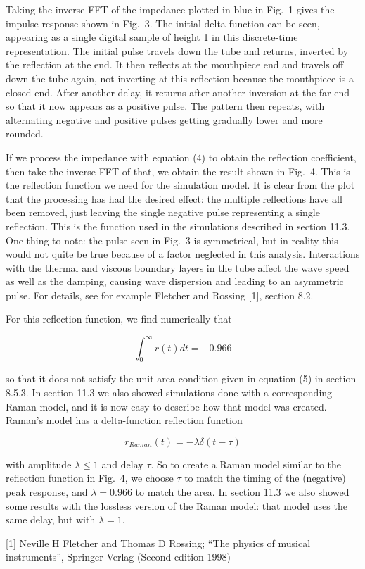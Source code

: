   Taking the inverse FFT of the impedance plotted in blue in Fig.\ 1 gives the 
  impulse response shown in Fig.\ 3. The initial delta function can be seen, 
  appearing as a single digital sample of height 1 in this discrete-time 
  representation. The initial pulse travels down the tube and returns, inverted 
  by the reflection at the end. It then reflects at the mouthpiece end and 
  travels off down the tube again, not inverting at this reflection because the 
  mouthpiece is a closed end. After another delay, it returns after another 
  inversion at the far end so that it now appears as a positive pulse. The 
  pattern then repeats, with alternating negative and positive pulses getting 
  gradually lower and more rounded. 


  If we process the impedance with equation (4) to obtain the reflection 
  coefficient, then take the inverse FFT of that, we obtain the result shown in 
  Fig.\ 4. This is the reflection function we need for the simulation model. It 
  is clear from the plot that the processing has had the desired effect: the 
  multiple reflections have all been removed, just leaving the single negative 
  pulse representing a single reflection. This is the function used in the 
  simulations described in section 11.3. One thing to note: the pulse seen in 
  Fig.\ 3 is symmetrical, but in reality this would not quite be true because 
  of a factor neglected in this analysis. Interactions with the thermal and 
  viscous boundary layers in the tube affect the wave speed as well as the 
  damping, causing wave dispersion and leading to an asymmetric pulse. For 
  details, see for example Fletcher and Rossing [1], section 8.2. 


  For this reflection function, we find numerically that 

  $$\int_0^\infty{r(t) dt}=-0.966$$ 

  so that it does not satisfy the unit-area condition given in equation (5) in 
  section 8.5.3. In section 11.3 we also showed simulations done with a 
  corresponding Raman model, and it is now easy to describe how that model was 
  created. Raman's model has a delta-function reflection function 

  $$r_{Raman}(t)=-\lambda \delta(t-\tau)$$ 

  with amplitude $\lambda \le 1$ and delay $\tau$. So to create a Raman model 
  similar to the reflection function in Fig.\ 4, we choose $\tau$ to match the 
  timing of the (negative) peak response, and $\lambda=0.966$ to match the 
  area. In section 11.3 we also showed some results with the lossless version 
  of the Raman model: that model uses the same delay, but with $\lambda=1$. 

  \sectionreferences{}[1] Neville H Fletcher and Thomas D Rossing; “The physics 
  of musical instruments”, Springer-Verlag (Second edition 1998) 